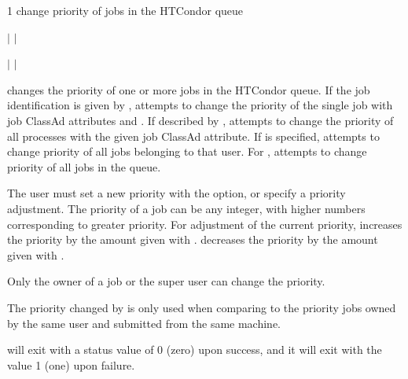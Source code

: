 \begin{ManPage}{\label{man-condor-prio}}{1}
{change priority of jobs in the HTCondor queue} 

\Synopsis {}
 $|$  $|$ 

 $|$  $|$ 
\Lbr {}   \Rbr
{}

\Description

 changes the priority of one or more jobs in the HTCondor queue.
If the job identification is given by ,
 attempts to change the priority of the single job
with job ClassAd attributes  and .
If described by ,
 attempts to change the priority of all processes with the
given  job ClassAd attribute.
If  is specified,  attempts to change priority
of all jobs belonging to that user.
For ,  attempts to change priority of
all jobs in the queue.

The user must set a new priority with the  option,
or specify a priority adjustment. 
The priority of a job can be any integer, with higher numbers
corresponding to greater priority.
For adjustment of the current priority,
 increases the priority by the amount given with .
 decreases the priority by the amount given with .

Only the owner of a job or the super user can change the priority.

The priority changed by  is only used when
comparing to the priority
jobs owned by the same user and submitted from the same machine.

\begin{Options}
\end{Options}

\ExitStatus

 will exit with a status value of 0 (zero) upon success,
and it will exit with the value 1 (one) upon failure.

\end{ManPage}
